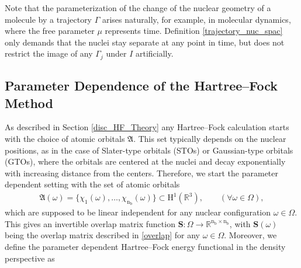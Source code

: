 \documentclass[reqno]{amsart}
\begin{document}
Note that the parameterization of the change of the nuclear geometry of a molecule by a trajectory $\Gamma$ arises naturally, for example, in molecular dynamics, where the free parameter $\mu$ represents time. Definition \ref{trajectory_nuc_spac} only demands that the nuclei stay separate at any point in time, but does not restrict the image of any $\Gamma_j$ under $I$ artificially.

\subsection{Parameter Dependence of the Hartree–Fock Method} As described in Section \ref{disc_HF_Theory} any Hartree–Fock calculation starts with the choice of atomic orbitals $\mathfrak{A}$. This set typically depends on the nuclear positions, as in the case of Slater-type orbitals (STOs) or Gaussian-type orbitals (GTOs), where the orbitals are centered at the nuclei and decay exponentially with increasing distance from the centers. Therefore, we start the parameter dependent setting with the set of atomic orbitals
\begin{align}
    \mathfrak{A}(\omega)=\big\lbrace \chi_1(\omega),\ldots,\chi_{\text{n}_\text{b}}(\omega)\big\rbrace\subset \mathrm{H}^1(\mathbb{R}^3),\qquad(\forall\omega\in \Omega),
\end{align}
which are supposed to be linear independent for any nuclear configuration $\omega\in \Omega$. This gives an invertible overlap matrix function $\mathbf{S}:\Omega \longrightarrow \mathbb{R}^{\text{n}_\text{b}\times \text{n}_\text{b}}$, with $\mathbf{S}(\omega)$ being the overlap matrix described in \eqref{overlap} for any $\omega \in \Omega$. Moreover, we define the parameter dependent Hartree–Fock energy functional in the density perspective as
\end{document}
